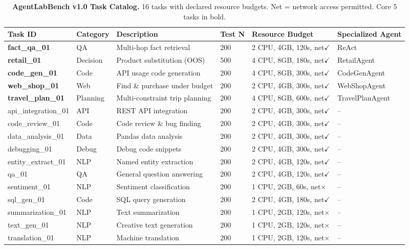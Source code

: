 \documentclass[letterpaper, 10 pt, conference]{ieeeconf}
\begin{document}
\begin{table}[t]
\centering
\caption{\textbf{AgentLabBench v1.0 Task Catalog.} 16 tasks with declared resource budgets. Net = network access permitted. Core 5 tasks in bold.}
\label{tab:tasks}
\footnotesize
\setlength{\tabcolsep}{4pt}
\begin{tabular}{llllll}
\toprule
\textbf{Task ID} & \textbf{Category} & \textbf{Description} & \textbf{Test N} & \textbf{Resource Budget} & \textbf{Specialized Agent} \\
\midrule
\textbf{fact\_qa\_01} & QA & Multi-hop fact retrieval & 200 & 2 CPU, 4GB, 120s, net$\checkmark$ & ReAct \\
\textbf{retail\_01} & Decision & Product substitution (OOS) & 500 & 4 CPU, 8GB, 180s, net$\checkmark$ & RetailAgent \\
\textbf{code\_gen\_01} & Code & API usage code generation & 200 & 4 CPU, 8GB, 300s, net$\checkmark$ & CodeGenAgent \\
\textbf{web\_shop\_01} & Web & Find \& purchase under budget & 200 & 2 CPU, 4GB, 300s, net$\checkmark$ & WebShopAgent \\
\textbf{travel\_plan\_01} & Planning & Multi-constraint trip planning & 200 & 4 CPU, 8GB, 600s, net$\checkmark$ & TravelPlanAgent \\
\midrule
api\_integration\_01 & API & REST API integration & 200 & 2 CPU, 4GB, 300s, net$\checkmark$ & -- \\
code\_review\_01 & Code & Code review \& bug finding & 200 & 2 CPU, 4GB, 300s, net$\checkmark$ & -- \\
data\_analysis\_01 & Data & Pandas data analysis & 200 & 2 CPU, 4GB, 300s, net$\checkmark$ & -- \\
debugging\_01 & Debug & Debug code snippets & 200 & 2 CPU, 4GB, 300s, net$\checkmark$ & -- \\
entity\_extract\_01 & NLP & Named entity extraction & 200 & 2 CPU, 4GB, 120s, net$\checkmark$ & -- \\
qa\_01 & QA & General question answering & 200 & 2 CPU, 4GB, 120s, net$\checkmark$ & -- \\
sentiment\_01 & NLP & Sentiment classification & 200 & 1 CPU, 2GB, 60s, net$\times$ & -- \\
sql\_gen\_01 & Code & SQL query generation & 200 & 2 CPU, 4GB, 180s, net$\checkmark$ & -- \\
summarization\_01 & NLP & Text summarization & 200 & 1 CPU, 2GB, 120s, net$\times$ & -- \\
text\_gen\_01 & NLP & Creative text generation & 200 & 1 CPU, 2GB, 120s, net$\times$ & -- \\
translation\_01 & NLP & Machine translation & 200 & 1 CPU, 2GB, 120s, net$\times$ & -- \\
\bottomrule
\end{tabular}
\end{table}
\end{document}
